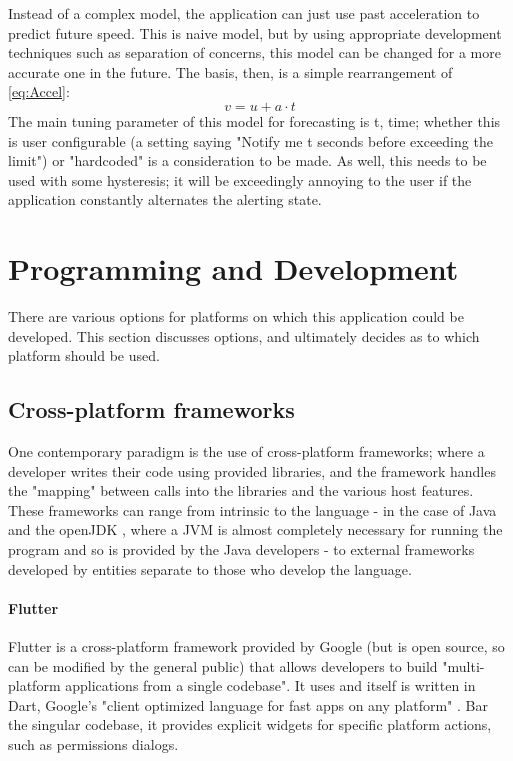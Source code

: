 \documentclass[11pt, a4paper, notitlepage]{report}
\begin{document}
Instead of a complex model, the application can just use past acceleration to predict future speed. This is naive model, but by using appropriate development techniques such as separation of concerns, this model can be changed for a more accurate one in the future. The basis, then, is a simple rearrangement of \ref{eq:Accel}:
\begin{equation}
    v = u + a \cdot t
\end{equation}
The main tuning parameter of this model for forecasting is t, time; whether this is user configurable (a setting saying "Notify me t seconds before exceeding the limit") or "hardcoded" is a consideration to be made. As well, this needs to be used with some hysteresis; it will be exceedingly annoying to the user if the application constantly alternates the alerting state.

\section{Programming and Development}
There are various options for platforms on which this application could be developed. This section discusses options, and ultimately decides as to which platform should be used.

\subsection{Cross-platform frameworks}
One contemporary paradigm is the use of cross-platform frameworks; where a developer writes their code using provided libraries, and the framework handles the "mapping" between calls into the libraries and the various host features. These frameworks can range from intrinsic to the language - in the case of Java and the openJDK \citep{openJdk}, where a JVM is almost completely necessary for running the program and so is provided by the Java developers - to external frameworks developed by entities separate to those who develop the language.

\paragraph{Flutter}
Flutter \citep{FlutterWebsite} is a cross-platform framework provided by Google (but is open source, so can be modified by the general public) that allows developers to build "multi-platform applications from a single codebase". It uses and itself is written in Dart, Google's "client optimized language for fast apps on any platform" \citep{dartWebsite}. Bar the singular codebase, it provides explicit widgets for specific platform actions, such as permissions dialogs.
\end{document}
